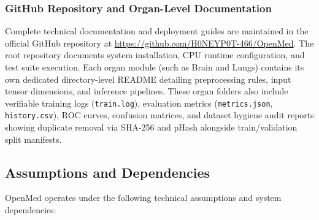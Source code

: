 \documentclass[12pt,a4paper]{report}
\begin{document}
\subsubsection{GitHub Repository and Organ-Level Documentation}
Complete technical documentation and deployment guides are maintained in the official GitHub repository at \url{https://github.com/H0NEYP0T-466/OpenMed}. The root repository documents system installation, CPU runtime configuration, and test suite execution. Each organ module (such as Brain and Lungs) contains its own dedicated directory-level README detailing preprocessing rules, input tensor dimensions, and inference pipelines. These organ folders also include verifiable training logs (\texttt{train.log}), evaluation metrics (\texttt{metrics.json}, \texttt{history.csv}), ROC curves, confusion matrices, and dataset hygiene audit reports showing duplicate removal via SHA-256 and pHash alongside train/validation split manifests.

\subsection{Assumptions and Dependencies}
OpenMed operates under the following technical assumptions and system dependencies:
\end{document}
